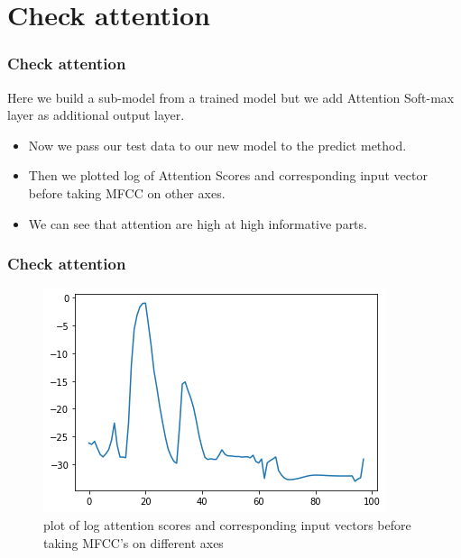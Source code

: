 \documentclass{beamer}
\begin{document}
\section{Check attention}


\begin{frame}
\frametitle{Check attention}

Here we build a sub-model from a trained model but we add Attention Soft-max layer
as additional output layer.\\
\begin{itemize}
    \item<1-> Now we pass our test data to our new model to the predict method.
    \item<2-> Then we plotted log of Attention Scores and corresponding input vector before taking MFCC on other axes.
    \item<3-> We can see that attention are high at high informative parts.
\end{itemize}

\end{frame}
\begin{frame}
\frametitle{Check attention}
\begin{figure}[h]
    \includegraphics[width=\columnwidth]{log.png}
    \caption{plot of log attention scores and corresponding input vectors before taking MFCC's on different axes}
\end{figure}\\


    
\end{frame}
\end{document}
